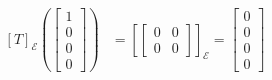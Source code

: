 \documentclass[12pt]{exam}
\begin{document}
\begin{questions}
\begin{parts}
\begin{solution}
\begin{align*}
                    \\
                    \left[T\right]_\mathcal E \left(\begin{bmatrix} 1 \\ 0 \\ 0 \\ 0 \end{bmatrix}\right) &= \left[ \begin{bmatrix*} 0 & 0 \\ 0 & 0 \end{bmatrix*}\right]_\mathcal E = \begin{bmatrix} 0 \\ 0 \\ 0 \\ 0 \end{bmatrix} 
                    \\
                \end{align*}
            \end{solution}

\end{parts}
\end{questions}
\end{document}
